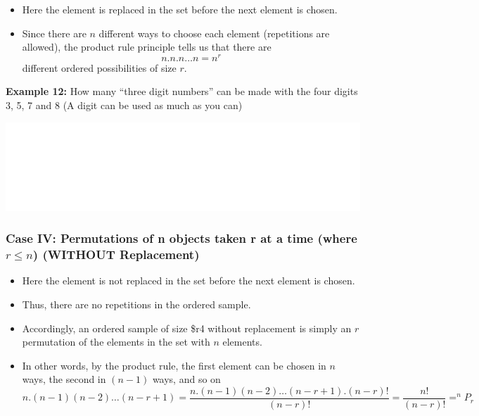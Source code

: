 \documentclass[]{book}
\providecommand{\tightlist}{%
  \setlength{\itemsep}{0pt}\setlength{\parskip}{0pt}}
\begin{document}
\begin{itemize}
\tightlist
\item
  Here the element is replaced in the set before the next element is chosen.
\item
  Since there are \(n\) different ways to choose each element (repetitions are allowed), the product rule principle tells us that there are
  \[n.n.n\dots n = n^r\]
  different ordered possibilities of size \(r\).
\end{itemize}

\textbf{Example 12:} How many ``three digit numbers'' can be made with the four digits 3, 5, 7 and 8 (A digit can be used as much as you can)

\begin{center}\includegraphics[width=1\linewidth]{figure/box89-1} \end{center}

\hypertarget{case-iv-permutations-of-n-objects-taken-r-at-a-time-where-r-leq-n-without-replacement}{%
\subsubsection{\texorpdfstring{Case IV: Permutations of n objects taken r at a time (where \(r \leq n\)) (WITHOUT Replacement)}{Case IV: Permutations of n objects taken r at a time (where r \textbackslash{}leq n) (WITHOUT Replacement)}}\label{case-iv-permutations-of-n-objects-taken-r-at-a-time-where-r-leq-n-without-replacement}}

\begin{itemize}
\tightlist
\item
  Here the element is not replaced in the set before the next element is chosen.
\item
  Thus, there are no repetitions in the ordered sample.
\item
  Accordingly, an ordered sample of size \$r4 without replacement is simply an \(r\) permutation of the elements in the set with \(n\) elements.
\item
  In other words, by the product rule, the first element can be chosen in \(n\) ways, the second in \((n-1)\) ways, and so on
  \[n.(n-1)(n-2)\dots (n-r+1) = \frac{n.(n-1)(n-2)\dots (n-r+1).(n-r)!}{(n-r)!} = \frac{n!}{(n-r)!} = ^nP_r\]
\end{itemize}
\end{document}
